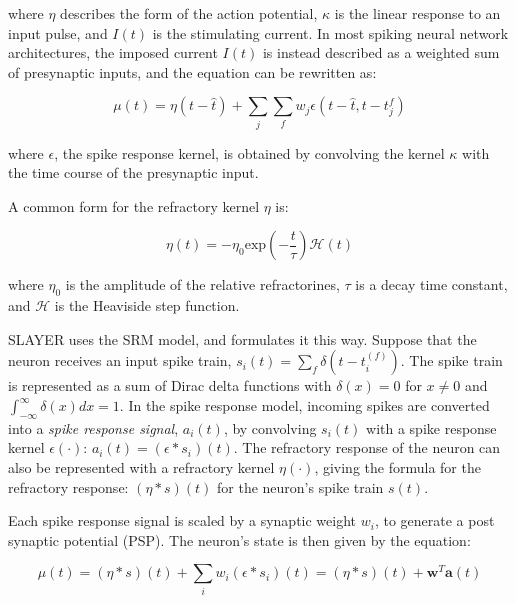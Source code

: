 \documentclass[fyp]{socreport}
\begin{document}
where $\eta$ describes the form of the action potential, $\kappa$ is the linear
response to an input pulse, and $I(t)$ is the stimulating current. In most
spiking neural network architectures, the imposed current $I(t)$ is instead
described as a weighted sum of presynaptic inputs, and the equation can be
rewritten as:

\begin{equation}
  \label{eq:srm-2}
  \mu(t) = \eta(t - \hat{t}) + \sum_{j} \sum_{f} w_{j}\epsilon(t - \hat{t}, t-t_{j}^{f})
\end{equation}


where $\epsilon$, the spike response kernel, is obtained by convolving the
kernel $\kappa$ with the time course of the presynaptic input.

A common form for the refractory kernel $\eta$ is:

\begin{equation}
  \label{eq:srm_eta}
  \eta(t) = - \eta_{0} \textrm{exp} \left(- \frac{t}{\tau}\right) \mathcal{H}(t)
\end{equation}

where $\eta_{0}$ is the amplitude of the relative refractorines, $\tau$ is a
decay time constant, and $\mathcal{H}$ is the Heaviside step function.

SLAYER uses the SRM model, and formulates it this way. Suppose that the neuron
receives an input spike train,
$s_i(t) = \sum_{f} \delta\left( t - t_i^{(f)} \right)$. The spike train is
represented as a sum of Dirac delta functions with \(\delta(x) = 0\) for
\(x \ne 0\) and \(\int_{-\infty}^{\infty} \delta(x)dx = 1\). In the spike
response model, incoming spikes are converted into a \emph{spike response
  signal}, $a_{i}(t)$, by convolving $s_{i}(t)$ with a spike response kernel
$\epsilon(\cdot)$: $a_{i}(t) = (\epsilon \ast s_{i})(t)$. The refractory
response of the neuron can also be represented with a refractory kernel
$\eta(\cdot)$, giving the formula for the refractory response:
$(\eta \ast s)(t)$ for the neuron's spike train $s(t)$.

Each spike response signal is scaled by a synaptic weight $w_{i}$, to generate a
post synaptic potential (PSP). The neuron's state is then given by the equation:

\begin{equation}
  \label{eq:slayer_srm}
  \mu(t) = (\eta \ast s)(t) + \sum_{i} w_{i}(\epsilon \ast s_{i})(t) = (\eta \ast s)(t) + \boldsymbol{w}^{T} \boldsymbol{a}(t)
\end{equation}
\end{document}
